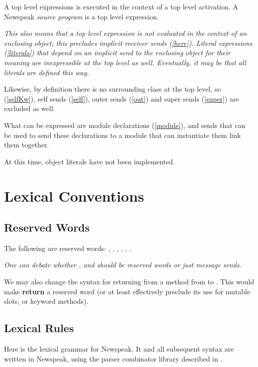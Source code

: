 \documentclass{article}
\begin{document}
A top level expressions is executed in the context of a top level activation. A Newspeak {\em source program} is a top level expression.
{\it
This also means that a top level expression is not evaluated in the context of an enclosing object; this precludes implicit receiver sends (\ref{here}).  Literal expressions (\ref{literals}) that depend on an implicit send to the enclosing object for their meaning are inexpressible at the top level as well. Eventually, it may be that all literals are defined this way.

Likewise, by definition there is no surrounding class at the top level, so \SELF{} (\ref{selfKw}), self sends (\ref{self}), outer sends (\ref{out}) and super sends (\ref{super}) are excluded as well.

What can be expressed are module declarations (\ref{module}), and sends that can be used to send these declarations to a module that can instantiate them link them together.

At this time, object literals have not been implemented. 
}

 


\section{Lexical Conventions}
\label{lex}

\subsection{Reserved Words}
\label{reserved}
 
The following  are reserved words: \SELF, \SUPER, \OUTER, \TRUE, \FALSE, \NIL.

{\it 
One can debate whether \TRUE, \FALSE{} and \NIL{} should be reserved words or just message sends. 

We may also change the syntax for returning from a method from  to . This would make {\bf return} a reserved word (or at least effectively preclude its use for mutable slots, or keyword methods).
}


\subsection{Lexical Rules}
\label{lexrules}

Here is the lexical grammar for Newspeak. It and all subsequent syntax are written in Newspeak, using the parser combinator library described in \cite{bracha07a}.
\end{document}
